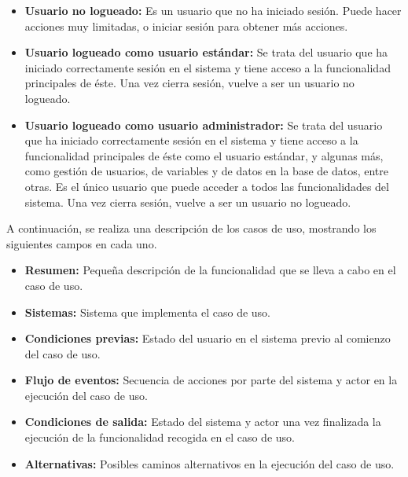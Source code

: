 \begin{itemize}
    \item \textbf{Usuario no logueado:} Es un usuario que no ha iniciado sesión. Puede hacer acciones muy limitadas, o iniciar sesión para obtener más acciones.
    \item \textbf{Usuario logueado como usuario estándar:} Se trata del usuario que ha iniciado correctamente sesión en el sistema y tiene acceso a la funcionalidad principales de éste. Una vez cierra sesión, vuelve a ser un usuario no logueado.
    \item \textbf{Usuario logueado como usuario administrador:} Se trata del usuario que ha iniciado correctamente sesión en el sistema y tiene acceso a la funcionalidad principales de éste como el usuario estándar, y algunas más, como gestión de usuarios, de variables y de datos en la base de datos, entre otras. Es el único usuario que puede acceder a todos las funcionalidades del sistema. Una vez cierra sesión, vuelve a ser un usuario no logueado.
\end{itemize}

A continuación, se realiza una descripción de los casos de uso, mostrando los siguientes campos en cada uno.

\begin{itemize}
    \item \textbf{Resumen:} Pequeña descripción de la funcionalidad que se lleva a cabo en el caso de uso. 
    \item \textbf{Sistemas:} Sistema que implementa el caso de uso. 
    \item \textbf{Condiciones previas:} Estado del usuario en el sistema previo al comienzo del caso de uso. 
    \item \textbf{Flujo de eventos:} Secuencia de acciones por parte del sistema y actor en la ejecución del caso de uso.
    \item \textbf{Condiciones de salida:} Estado del sistema y actor una vez finalizada la ejecución de la funcionalidad recogida en el caso de uso.
    \item \textbf{Alternativas:} Posibles caminos alternativos en la ejecución del caso de uso. 
\end{itemize}

